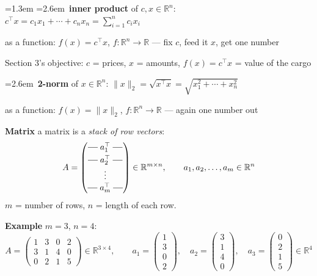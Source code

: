 \documentclass[10pt]{article}
\newenvironment{board}{%
  \par\vspace{4pt}
  \begingroup\leftskip=1.3em\relax\parskip=2pt\relax}{%
  \par\endgroup\vspace{4pt}}
\newcommand{\rowline}{\rule[0.55ex]{1.15em}{0.4pt}}
\newcommand{\bul}{\hangindent=2.6em\hangafter=1\hspace{1.2em}\textbullet\ \ignorespaces}
\begin{document}
\begin{board}
\bul \textbf{inner product} of $c, x \in \mathbb{R}^n$: \quad$c^{\top}x = c_1x_1 + \cdots + c_nx_n = \sum_{i=1}^{n} c_i x_i$
\vspace{3pt}

\qquad as a function: \quad $f(x) = c^{\top}x$, \quad $f : \mathbb{R}^n \to \mathbb{R}$ \quad --- fix $c$, feed it $x$, get one number
\vspace{2pt}

\qquad Section 3's objective: $c$ = prices, $x$ = amounts, $f(x) = c^{\top}x$ = value of the cargo
\vspace{5pt}

\bul \textbf{2-norm} of $x \in \mathbb{R}^n$: \quad$\|x\|_2 = \sqrt{x^{\top}x} = \sqrt{x_1^2 + \cdots + x_n^2}$
\vspace{3pt}

\qquad as a function: \quad $f(x) = \|x\|_2$, \quad $f : \mathbb{R}^n \to \mathbb{R}$ \quad --- again one number out
\vspace{10pt}

\textbf{Matrix} \quad a matrix is a \emph{stack of row vectors}:
\[
A = \begin{pmatrix}
  \rowline\; a_1^{\top} \;\rowline \\[3pt]
  \rowline\; a_2^{\top} \;\rowline \\[1pt]
  \vdots \\[1pt]
  \rowline\; a_m^{\top} \;\rowline
\end{pmatrix} \in \mathbb{R}^{m \times n},
\qquad a_1, a_2, \dots, a_m \in \mathbb{R}^n
\]
$m$ = number of rows, \quad $n$ = length of each row.
\vspace{6pt}

\textbf{Example} \quad $m = 3$, $n = 4$:
\[
A = \begin{pmatrix}
 1 & 3 & 0 & 2 \\
 3 & 1 & 4 & 0 \\
 0 & 2 & 1 & 5
\end{pmatrix} \in \mathbb{R}^{3 \times 4},
\qquad
a_1 = \begin{pmatrix} 1 \\ 3 \\ 0 \\ 2 \end{pmatrix}, \quad
a_2 = \begin{pmatrix} 3 \\ 1 \\ 4 \\ 0 \end{pmatrix}, \quad
a_3 = \begin{pmatrix} 0 \\ 2 \\ 1 \\ 5 \end{pmatrix} \in \mathbb{R}^4
\]
\vspace{2pt}


\end{board}
\end{document}
